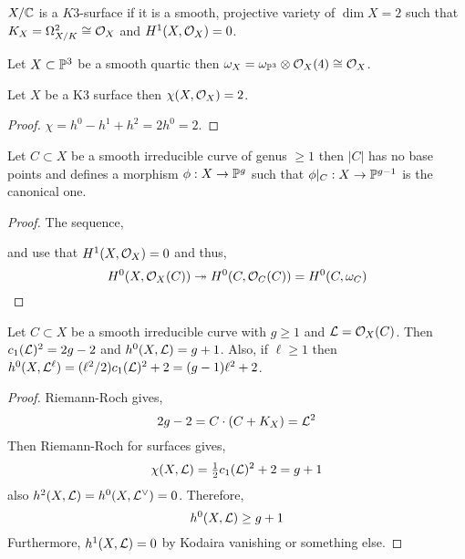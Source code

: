 \documentclass[12pt]{article}
\begin{document}
\begin{defn}
$X / \CC$ is a $K3$-surface if it is a smooth, projective variety of $\dim{X} = 2$ such that $K_X = \Omega^2_{X/K} \cong \struct{X}$ and $H^1(X, \struct{X}) = 0$. 
\end{defn}

\begin{example}
Let $X \subset \P^3$ be a smooth quartic then $\omega_X = \omega_{\P^3} \ot \struct{X}(4) \cong \struct{X}$.
\end{example}

\begin{lemma}
Let $X$ be a K3 surface then $\chi(X, \struct{X}) = 2$.
\end{lemma}

\begin{proof}
$\chi = h^0 - h^1 + h^2 = 2 h^0 = 2$. 
\end{proof}

\begin{prop}
Let $C \subset X$ be a smooth irreducible curve of genus $\ge 1$ then $|C|$ has no base points and defines a morphism $\phi : X \to \P^g$ such that $\phi |_C : X \to \P^{g-1}$ is the canonical one.
\end{prop}

\begin{proof}
The sequence,
\begin{center}
\end{center}
and use that $H^1(X, \struct{X}) = 0$ and thus,
\[ H^0(X, \struct{X}(C)) \onto H^0(C, \struct{C}(C)) = H^0(C, \omega_C) \]
\end{proof}

\begin{lemma}
Let $C \subset X$ be a smooth irreducible curve with $g \ge 1$ and $\L = \struct{X}(C)$. Then $c_1(\L)^2 = 2 g - 2$ and $h^0(X, \L) = g+1$. Also, if $\ell \ge 1$ then $h^0(X, \L^{\ell}) = (\ell^2/2) c_1(\L)^2 + 2 = (g - 1) \ell^2 + 2$. 
\end{lemma}

\begin{proof}
Riemann-Roch gives,
\[ 2 g - 2 = C \cdot (C + K_X) = \L^2 \]
Then Riemann-Roch for surfaces gives,
\[ \chi(X, \L) = \tfrac{1}{2} c_1(\L)^2 + 2 = g  +1 \]
also $h^2(X, \L) = h^0(X, \L^\vee) = 0$. Therefore,
\[ h^0(X, \L) \ge g + 1 \]
Furthermore, $h^1(X, \L) = 0$ by Kodaira vanishing or something else. 
\end{proof}
\end{document}
